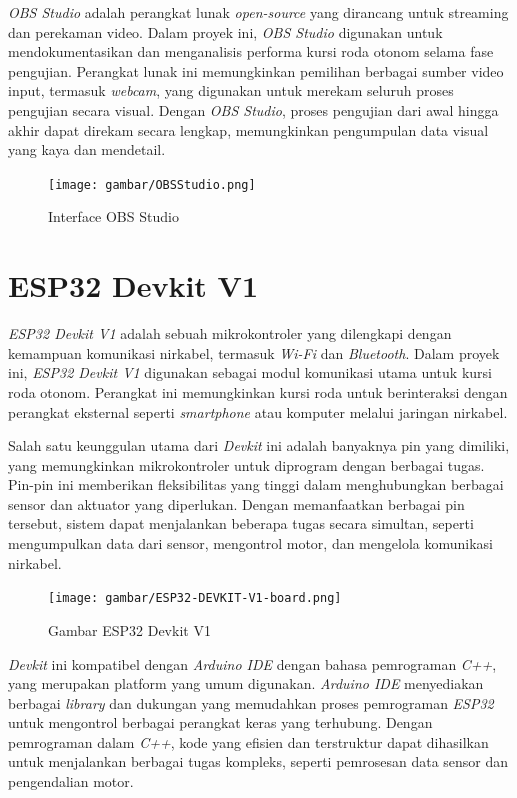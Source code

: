 \emph{OBS Studio} adalah perangkat lunak \emph{open-source} yang dirancang untuk streaming dan perekaman video. Dalam proyek ini, \emph{OBS Studio} digunakan untuk mendokumentasikan dan menganalisis performa kursi roda otonom selama fase pengujian. Perangkat lunak ini memungkinkan pemilihan berbagai sumber video input, termasuk \emph{webcam}, yang digunakan untuk merekam seluruh proses pengujian secara visual. Dengan \emph{OBS Studio}, proses pengujian dari awal hingga akhir dapat direkam secara lengkap, memungkinkan pengumpulan data visual yang kaya dan mendetail.

\begin{figure}[H]
  \centering
  \texttt{[image: gambar/OBSStudio.png]}
  \caption{Interface OBS Studio}
  \label{fig:Gambar OBS}
\end{figure}

\section{ESP32 Devkit V1}
\label{sec:ESP32 Devkit V1}

\emph{ESP32 Devkit V1} adalah sebuah mikrokontroler yang dilengkapi dengan kemampuan komunikasi nirkabel, termasuk \emph{Wi-Fi} dan \emph{Bluetooth}. Dalam proyek ini, \emph{ESP32 Devkit V1} digunakan sebagai modul komunikasi utama untuk kursi roda otonom. Perangkat ini memungkinkan kursi roda untuk berinteraksi dengan perangkat eksternal seperti \emph{smartphone} atau komputer melalui jaringan nirkabel.

Salah satu keunggulan utama dari \emph{Devkit} ini adalah banyaknya pin yang dimiliki, yang memungkinkan mikrokontroler untuk diprogram dengan berbagai tugas. Pin-pin ini memberikan fleksibilitas yang tinggi dalam menghubungkan berbagai sensor dan aktuator yang diperlukan. Dengan memanfaatkan berbagai pin tersebut, sistem dapat menjalankan beberapa tugas secara simultan, seperti mengumpulkan data dari sensor, mengontrol motor, dan mengelola komunikasi nirkabel.

\begin{figure}[H]
  \centering
  \texttt{[image: gambar/ESP32-DEVKIT-V1-board.png]}
  \caption{Gambar ESP32 Devkit V1}
  \label{fig:Gambar ESP32Devkit V1}
\end{figure}

\emph{Devkit} ini kompatibel dengan \emph{Arduino IDE} dengan bahasa pemrograman \emph{C++}, yang merupakan platform yang umum digunakan. \emph{Arduino IDE} menyediakan berbagai \emph{library} dan dukungan yang memudahkan proses pemrograman \emph{ESP32} untuk mengontrol berbagai perangkat keras yang terhubung. Dengan pemrograman dalam \emph{C++}, kode yang efisien dan terstruktur dapat dihasilkan untuk menjalankan berbagai tugas kompleks, seperti pemrosesan data sensor dan pengendalian motor.

